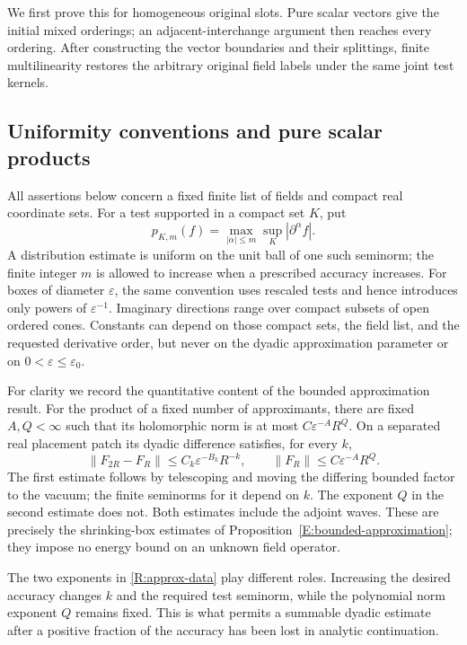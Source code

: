 We first prove this for homogeneous original slots.  Pure scalar
vectors give the initial mixed orderings; an adjacent-interchange
argument then reaches every ordering.  After constructing the vector
boundaries and their splittings, finite multilinearity restores the
arbitrary original field labels under the same joint test kernels.

\subsection{Uniformity conventions and pure scalar products}

All assertions below concern a fixed finite list of fields and compact
real coordinate sets.  For a test supported in a compact set $K$, put
\begin{equation}\label{R:seminorm}
 p_{K,m}(f)=\max_{|\alpha|\leq m}\sup_K|\partial^\alpha f|.
\end{equation}
A distribution estimate is uniform on the unit ball of one such seminorm;
the finite integer $m$ is allowed to increase when a prescribed accuracy
increases.  For boxes of diameter $\varepsilon$, the same convention
uses rescaled tests and hence introduces only powers of
$\varepsilon^{-1}$.  Imaginary directions range over compact subsets of
open ordered cones.  Constants can depend on those compact sets, the
field list, and the requested derivative order, but never on the dyadic
approximation parameter or on $0<\varepsilon\leq\varepsilon_0$.

For clarity we record the quantitative content of the bounded
approximation result.  For the product of a fixed number of approximants,
there are fixed $A,Q<\infty$ such that its holomorphic norm is at most
$C\varepsilon^{-A}R^Q$.  On a separated real placement patch its dyadic
difference satisfies, for every $k$,
\begin{equation}\label{R:approx-data}
 \|F_{2R}-F_R\|\leq C_k\varepsilon^{-B_k}R^{-k},
 \qquad
 \|F_R\|\leq C\varepsilon^{-A}R^Q.
\end{equation}
The first estimate follows by telescoping and moving the differing
bounded factor to the vacuum; the finite seminorms for it depend on $k$.
The exponent $Q$ in the second estimate does not.  Both estimates include
the adjoint waves.  These are precisely the shrinking-box estimates of
Proposition~\ref{E:bounded-approximation}; they impose no energy bound on
an unknown field operator.

The two exponents in \eqref{R:approx-data} play different roles.
Increasing the desired accuracy changes $k$ and the required test
seminorm, while the polynomial norm exponent $Q$ remains fixed.
This is what permits a summable dyadic estimate after a positive
fraction of the accuracy has been lost in analytic continuation.

